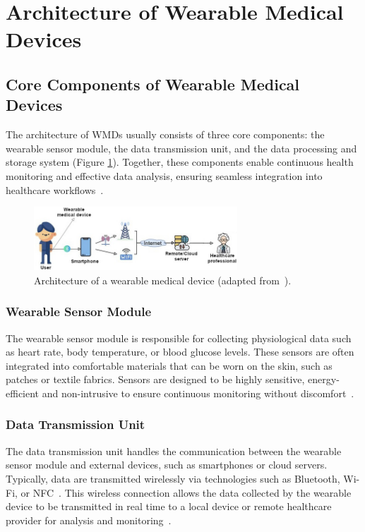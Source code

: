 \documentclass[journal]{IEEEtran}
\begin{document}
\section{Architecture of Wearable Medical Devices}
\label{4.Architecture}
    \subsection{Core Components of Wearable Medical Devices}
    
    The architecture of WMDs usually consists of three core components: the wearable sensor module, the data transmission unit, and the data processing and storage system (Figure \ref{fig:architecture}). Together, these components enable continuous health monitoring and effective data analysis, ensuring seamless integration into healthcare workflows~\cite{Ates2022}.

    \begin{figure}[!t]
    \centering
    \includegraphics[width=3in]{Wearables_SEB_2024-2025_Group1/Figuras/architecture.jpeg}
    \caption{Architecture of a wearable medical device (adapted from~\cite{Saifuzzaman2021}).}
    \label{fig:architecture}
    \end{figure}
    
        \subsubsection{Wearable Sensor Module}
        
        The wearable sensor module is responsible for collecting physiological data such as heart rate, body temperature, or blood glucose levels. These sensors are often integrated into comfortable materials that can be worn on the skin, such as patches or textile fabrics. Sensors are designed to be highly sensitive, energy-efficient and non-intrusive to ensure continuous monitoring without discomfort~\cite{Saifuzzaman2021}.
        
        \subsubsection{Data Transmission Unit}
        
        The data transmission unit handles the communication between the wearable sensor module and external devices, such as smartphones or cloud servers. Typically, data are transmitted wirelessly via technologies such as Bluetooth, Wi-Fi, or NFC~\cite{Guk2019}. This wireless connection allows the data collected by the wearable device to be transmitted in real time to a local device or remote healthcare provider for analysis and monitoring~\cite{Nahavandi2022}.
\end{document}
